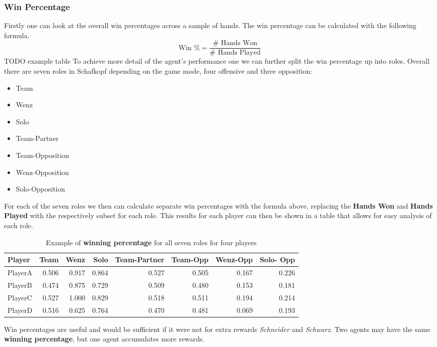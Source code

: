 \subsubsection{Win Percentage}
Firstly one can look at the overall win percentages across a sample of hands.
The win percentage can be calculated with the following formula.
\[\text{Win \%} = \frac{\# \text{ Hands Won}}{\# \text{ Hands Played}}\]
TODO example table
To achieve more detail of the agent's performance one we can further split the win percentage up into roles.
Overall there are seven roles in Schafkopf depending on the game mode, four offensive and three opposition:
\begin{itemize}
    \item Team 
    \item Wenz 
    \item Solo 
    \item Team-Partner 
    \item Team-Opposition
    \item Wenz-Opposition
    \item Solo-Opposition
\end{itemize}
For each of the seven roles we then can calculate separate win percentages with the formula above, replacing the
\textbf{Hands Won} and \textbf{Hands Played} with the respectively subset for each role.
\newline
This results for each player can then be shown in a table that allows for easy analysis of each role.
\newline
\begin{table}
\begin{tabular}{lrrrrrrr}
    \toprule
    Player & Team & Wenz & Solo & Team-Partner & Team-Opp & Wenz-Opp & Solo-
    Opp \\
    \midrule
    PlayerA & 0.506 & 0.917 & 0.864 & 0.527 & 0.505 & 0.167 & 0.226 \\
    PlayerB & 0.474 & 0.875 & 0.729 & 0.509 & 0.480 & 0.153 & 0.181 \\
    PlayerC & 0.527 & 1.000 & 0.829 & 0.518 & 0.511 & 0.194 & 0.214 \\
    PlayerD & 0.516 & 0.625 & 0.764 & 0.470 & 0.481 & 0.069 & 0.193 \\
    \bottomrule
\end{tabular}
\caption{Example of \textbf{winning percentage} for all seven roles for four players}
\label{winpercentageroles}
\end{table}
\newline
Win percentages are useful and would be sufficient if it were not for extra rewards \textit{Schneider} and
\textit{Schwarz}.
Two agents may have the same \textbf{winning percentage}, but one agent accumulates more rewards.

